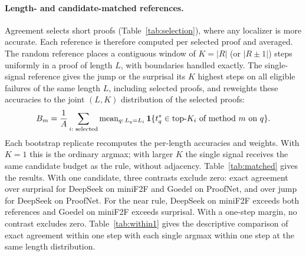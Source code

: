\paragraph{Length- and candidate-matched references.} Agreement selects short proofs (Table~\ref{tab:selection}), where any localizer is more accurate. Each reference is therefore computed per selected proof and averaged. The random reference places a contiguous window of $K=|R|$ (or $|R\pm1|$) steps uniformly in a proof of length $L$, with boundaries handled exactly. The single-signal reference gives the jump or the surprisal its $K$ highest steps on all eligible failures of the same length $L$, including selected proofs, and reweights these accuracies to the joint $(L,K)$ distribution of the selected proofs:
\[
B_m=\frac1A\sum_{i:\text{ selected}}\operatorname{mean}_{q:\,L_q=L_i}\mathbf{1}\{t_q^*\in\text{top-}K_i\text{ of method }m\text{ on }q\}.
\]
Each bootstrap replicate recomputes the per-length accuracies and weights. With $K=1$ this is the ordinary argmax; with larger $K$ the single signal receives the same candidate budget as the rule, without adjacency. Table~\ref{tab:matched} gives the results. With one candidate, three contrasts exclude zero: exact agreement over surprisal for DeepSeek on miniF2F and Goedel on ProofNet, and over jump for DeepSeek on ProofNet. For the near rule, DeepSeek on miniF2F exceeds both references and Goedel on miniF2F exceeds surprisal. With a one-step margin, no contrast excludes zero. Table~\ref{tab:within1} gives the descriptive comparison of exact agreement within one step with each single argmax within one step at the same length distribution.

